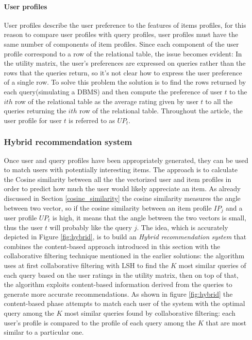 \paragraph{User profiles} User profiles describe the user preference to the features of items profiles, for this reason to compare user profiles with query profiles, user profiles must have the same number of components of item profiles. Since each component of the user profile correspond to a row of the relational table, the issue becomes evident: In the utility matrix, the user's preferences are expressed on queries rather than the rows that the queries return, so it's not clear how to express the user preference of a single row. To solve this problem the solution is to find the rows returned by each query(simulating a DBMS) and then compute the preference of user $t$ to the $ith$ row of the relational table as the average rating given by user $t$ to all the queries returning the $ith$ row of the relational table. Throughout the article, the user profile for user $t$ is referred to as $UP_t$. 


\subsubsection{Hybrid recommendation system} 
Once user and query profiles have been appropriately generated, they can be used to match users with potentially interesting items. The approach is to calculate the Cosine similarity between all the the vectorized user and item profiles in order to predict how much the user would likely appreciate an item. As already discussed in Section \ref{cosine_similarity} the cosine similarity measures the angle between two vector, so if the cosine similarity between an item profile $IP_j$ and a user profile $UP_t$ is high, it means that the angle between the two vectors is small, thus the user $t$ will probably like the query $j$. %
The idea, which is accurately depicted in Figure \ref{fig:hybrid}, is to build an \emph{Hybrid recommendation system} that combines the content-based approach introduced in this section with the collaborative filtering technique mentioned in the earlier solutions: the algorithm uses at first collaborative filtering with LSH to find the $K$ most similar queries of each query based on the user ratings in the utility matrix, then on top of that, the algorithm exploits content-based information derived from the queries to generate more accurate recommendations. As shown in figure \ref{fig:hybrid} the content-based phase attempts to match each user of the system with the optimal query among the $K$ most similar queries found by collaborative filtering: each user's profile is compared to the profile of each query among the $K$ that are most similar to a particular one. 

